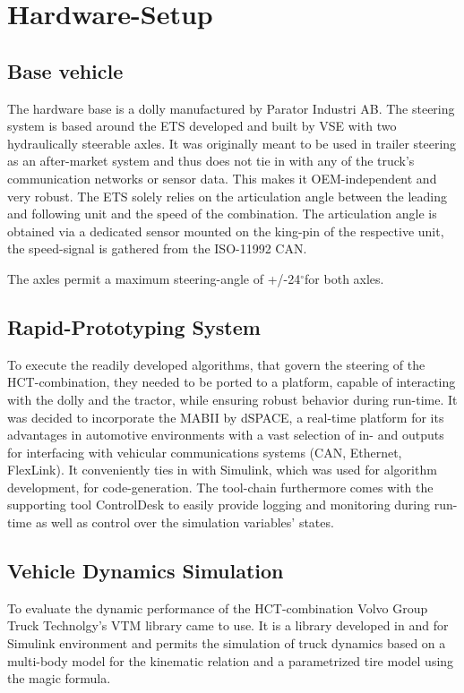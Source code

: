 \documentclass[root.tex]{subfiles}
\begin{document}
{\pagestyle{empty}}
\section{Hardware-Setup}
\label{chap:Hardware-Setup}
\subsection{Base vehicle}
\label{sec:basevehicle}

The hardware base is a dolly manufactured by Parator Industri AB\cite{paratorAB}. The steering system is based around the \gls{ETS} developed and built by \gls{VSE}\cite{vse} with two hydraulically steerable axles. It was originally meant to be used in trailer steering as an after-market system and thus does not tie in with any of the truck's communication networks or sensor data. This makes it OEM-independent and very robust. The \gls{ETS} solely relies on the articulation angle between the leading and following unit and the speed of the combination. The articulation angle is obtained via a dedicated sensor mounted on the king-pin of the respective unit, the speed-signal is gathered from the ISO-11992 \gls{CAN}. 

The axles permit a maximum steering-angle of +/-24$^{\circ}$for both axles. 
\subsection{Rapid-Prototyping System}

To execute the readily developed algorithms, that govern the steering of the \gls{HCT}-combination, they needed to be ported to a platform, capable of interacting with the dolly and the tractor, while ensuring robust behavior during run-time. It was decided to incorporate the \gls{MABII}\cite{mabii} by dSPACE\cite{dspace}, a real-time platform for its advantages in automotive environments with a vast selection of in- and outputs for interfacing with vehicular communications systems (\gls{CAN}, Ethernet, FlexLink). It conveniently ties in with Simulink, which was used for algorithm development, for code-generation. %
 The tool-chain furthermore comes with the supporting tool ControlDesk to easily provide logging and monitoring during run-time as well as control over the simulation variables' states.


\subsection{Vehicle Dynamics Simulation}
To evaluate the dynamic performance of the \gls{HCT}-combination Volvo Group Truck Technolgy's\cite{volvogtt} \gls{VTM} library came to use. It is a library developed in and for Simulink environment and permits the simulation of truck dynamics based on a multi-body model for the kinematic relation and a parametrized tire model using the magic formula.
\end{document}
